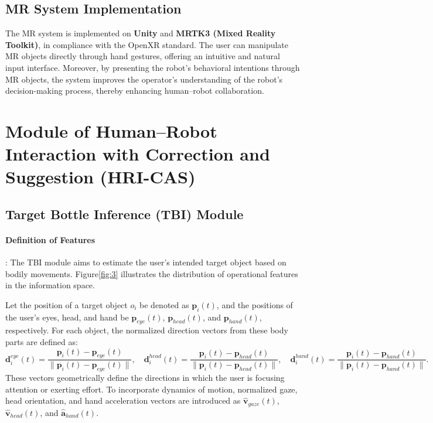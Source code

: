 \documentclass[../../main.tex]{subfiles} %
\begin{document}
\subsection{MR System Implementation}
The MR system is implemented on \textbf{Unity} and \textbf{MRTK3 (Mixed Reality Toolkit)}, 
in compliance with the OpenXR standard.  
The user can manipulate MR objects directly through hand gestures, 
offering an intuitive and natural input interface.  
Moreover, by presenting the robot’s behavioral intentions through MR objects, 
the system improves the operator’s understanding of the robot’s decision-making process, 
thereby enhancing human–robot collaboration.


\section{Module of Human–Robot Interaction with Correction and Suggestion (HRI-CAS)}
\subsection{Target Bottle Inference (TBI) Module}

\paragraph{Definition of Features}:  
The TBI module aims to estimate the user’s intended target object based on bodily movements.  
Figure\ref{fig:3} illustrates the distribution of operational features in the information space.  

Let the position of a target object $o_i$ be denoted as $\mathbf{p}_i(t)$,  
and the positions of the user’s eyes, head, 
and hand be $\mathbf{p}_{eye}(t)$, $\mathbf{p}_{head}(t)$, and $\mathbf{p}_{hand}(t)$, respectively.  
For each object, the normalized direction vectors from these body parts are defined as:
\begin{equation}
\mathbf{d}_i^{eye}(t) = \frac{\mathbf{p}_i(t)-\mathbf{p}_{eye}(t)}{\|\mathbf{p}_i(t)-\mathbf{p}_{eye}(t)\|}, \quad
\mathbf{d}_i^{head}(t) = \frac{\mathbf{p}_i(t)-\mathbf{p}_{head}(t)}{\|\mathbf{p}_i(t)-\mathbf{p}_{head}(t)\|}, \quad
\mathbf{d}_i^{hand}(t) = \frac{\mathbf{p}_i(t)-\mathbf{p}_{hand}(t)}{\|\mathbf{p}_i(t)-\mathbf{p}_{hand}(t)\|}.
\end{equation}
These vectors geometrically define the directions in which the user is focusing attention or exerting effort.  
To incorporate dynamics of motion, normalized gaze, head orientation, and hand acceleration vectors are introduced as  
$\hat{\mathbf{v}}_{gaze}(t)$, $\hat{\mathbf{v}}_{head}(t)$, and $\hat{\mathbf{a}}_{hand}(t)$.
\end{document}

